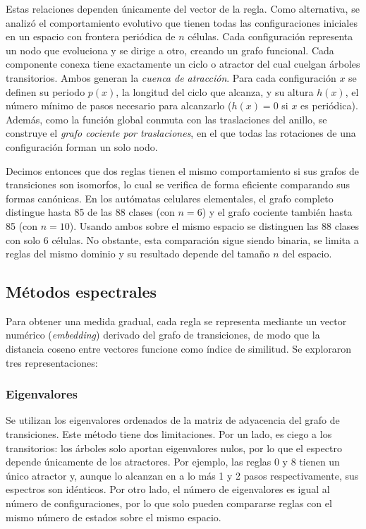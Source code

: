 Estas relaciones dependen únicamente del vector de la regla. Como alternativa, se analizó el comportamiento evolutivo que tienen todas las configuraciones iniciales en un espacio con frontera periódica de $n$ células. Cada configuración representa un nodo que evoluciona y se dirige a otro, creando un grafo funcional. Cada componente conexa tiene exactamente un ciclo o atractor del cual cuelgan árboles transitorios. Ambos generan la \textit{cuenca de atracción}. Para cada configuración $x$ se definen su periodo $p(x)$, la longitud del ciclo que alcanza, y su altura $h(x)$, el número mínimo de pasos necesario para alcanzarlo ($h(x) = 0$ si $x$ es periódica). Además, como la función global conmuta con las traslaciones del anillo, se construye el \textit{grafo cociente por traslaciones}, en el que todas las rotaciones de una configuración forman un solo nodo.

Decimos entonces que dos reglas tienen el mismo comportamiento si sus grafos de transiciones son isomorfos, lo cual se verifica de forma eficiente comparando sus formas canónicas. En los autómatas celulares elementales, el grafo completo distingue hasta 85 de las 88 clases (con $n = 6$) y el grafo cociente también hasta 85 (con $n = 10$). Usando ambos sobre el mismo espacio se distinguen las 88 clases con solo 6 células. No obstante, esta comparación sigue siendo binaria, se limita a reglas del mismo dominio y su resultado depende del tamaño $n$ del espacio.

\subsection{Métodos espectrales}

Para obtener una medida gradual, cada regla se representa mediante un vector numérico (\textit{embedding}) derivado del grafo de transiciones, de modo que la distancia coseno entre vectores funcione como índice de similitud. Se exploraron tres representaciones:

\subsubsection{Eigenvalores}

Se utilizan los eigenvalores ordenados de la matriz de adyacencia del grafo de transiciones. Este método tiene dos limitaciones. Por un lado, es ciego a los transitorios: los árboles solo aportan eigenvalores nulos, por lo que el espectro depende únicamente de los atractores. Por ejemplo, las reglas 0 y 8 tienen un único atractor y, aunque lo alcanzan en a lo más 1 y 2 pasos respectivamente, sus espectros son idénticos. Por otro lado, el número de eigenvalores es igual al número de configuraciones, por lo que solo pueden compararse reglas con el mismo número de estados sobre el mismo espacio.
	
